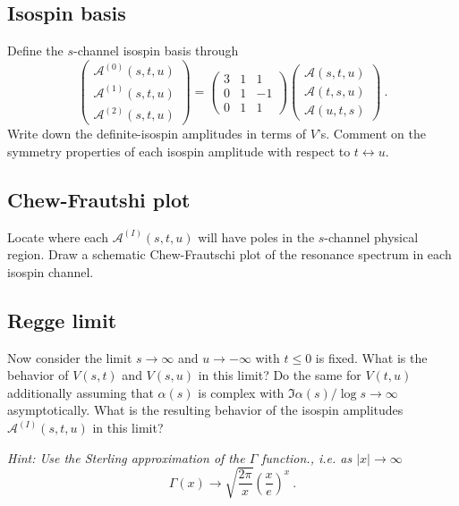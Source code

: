 \subsection{Isospin basis} 
Define the $s$-channel isospin basis through
    \begin{equation}
        \begin{pmatrix}
            \mathcal{A}^{(0)}(s,t,u) \\
            \mathcal{A}^{(1)}(s,t,u) \\
            \mathcal{A}^{(2)}(s,t,u)             
        \end{pmatrix}
        = 
        \begin{pmatrix}
            3 & 1 & 1 \\
            0 & 1 & -1 \\
            0 & 1 & 1 
        \end{pmatrix}
        \begin{pmatrix}
            \mathcal{A}(s,t,u) \\
            \mathcal{A}(t,s,u) \\
            \mathcal{A}(u,t,s)              
        \end{pmatrix}
        ~.
    \end{equation}
Write down the definite-isospin amplitudes in terms of $V$'s. Comment on the symmetry properties of each isospin amplitude with respect to $t \leftrightarrow u$. 

\subsection{Chew-Frautshi plot}
Locate where each $\mathcal{A}^{(I)}(s,t,u)$ will have poles in the $s$-channel physical region. Draw a schematic Chew-Frautschi plot of the resonance spectrum in each isospin channel.

\subsection{Regge limit}
Now consider the limit $s \to \infty$ and $u \to - \infty$ with $t \leq 0$ is fixed. What is the behavior of $V(s,t)$ and $V(s,u)$ in this limit? Do the same for $V(t,u)$ additionally assuming that $\alpha(s)$ is complex with $\Im\alpha(s) /\log s \to \infty$ asymptotically. What is the resulting behavior of the isospin amplitudes $\mathcal{A}^{(I)}(s,t,u)$ in this limit?

\noindent \textit{ Hint: Use the Sterling approximation of the $\Gamma$ function., i.e. as $|x|\to \infty$
    \begin{equation}
        \Gamma(x) \to \sqrt{\frac{2\pi}{x}} \left( \frac{x}{e} \right)^x ~.
    \end{equation}
}

